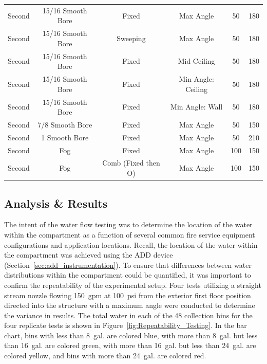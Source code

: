 \documentclass{article}
\begin{document}
\begin{table}[!ht]
\begin{tabular}{lccccc}
Second & 15/16 Smooth Bore  & Fixed    & Max Angle             & 50 & 180 \\
Second & 15/16 Smooth Bore  & Sweeping & Max Angle             & 50 & 180 \\
Second & 15/16 Smooth Bore  & Fixed    & Mid Ceiling           & 50 & 180 \\
Second & 15/16 Smooth Bore  & Fixed    & Min Angle: Ceiling    & 50 & 180 \\
Second & 15/16 Smooth Bore  & Fixed    & Min Angle: Wall       & 50 & 180 \\
Second & 7/8 Smooth Bore    & Fixed    & Max Angle             & 50 & 150 \\
Second & 1 Smooth Bore      & Fixed    & Max Angle             & 50 & 210 \\
Second & Fog                & Fixed    & Max Angle             & 100 & 150 \\
Second & Fog                & Comb (Fixed then O)    & Max Angle  & 100 & 150 \\
\bottomrule[1.25pt]
\end{tabular}
\end{table}

\clearpage

\subsection{Analysis \& Results}

The intent of the water flow testing was to determine the location of the water within the compartment as a function of several common fire service equipment configurations and application locations. Recall, the location of the water within the compartment was achieved using the ADD device (Section~\ref{sec:add_instrumentation}). To ensure that differences between water distributions within the compartment could be quantified, it was important to confirm the repeatability of the experimental setup. Four tests utilizing a straight stream nozzle flowing 150~gpm at 100~psi from the exterior first floor position directed into the structure with a maximum angle were conducted to determine the variance in results. The total water in each of the 48 collection bins for the four replicate tests is shown in Figure~\ref{fig:Repeatability_Testing}. In the bar chart, bins with less than 8~gal. are colored blue, with more than 8~gal. but less than 16~gal. are colored green, with more than 16~gal. but less than 24~gal. are colored yellow, and bins with more than 24~gal. are colored red. 
\end{document}
